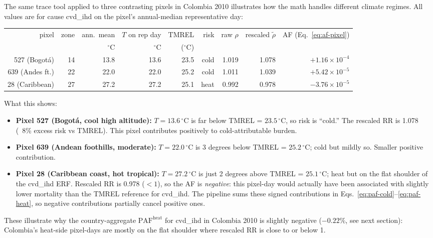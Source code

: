 \documentclass[11pt]{article}
\newcommand{\PAF}{\text{PAF}}
\begin{document}
The same trace tool applied to three contrasting pixels in Colombia 2010
illustrates how the math handles different climate regimes. All values
are for cause cvd\_ihd on the pixel's annual-median representative day:

\begin{center}
\small
\begin{tabular}{r r r r r r r r r}
\toprule
pixel & zone & ann.\ mean & $T$ on rep day & TMREL & risk & raw $\rho$ & rescaled $\tilde\rho$ & AF (Eq.\ \ref{eq:af-pixel}) \\
& & $^{\circ}$C & $^{\circ}$C & ($^{\circ}$C) & & & & \\
\midrule
527 (Bogotá) & 14 & 13.8 & 13.6 & 23.5 & cold & 1.019 & 1.078 & $+1.16\!\times\!10^{-4}$ \\
639 (Andes ft.) & 22 & 22.0 & 22.0 & 25.2 & cold & 1.011 & 1.039 & $+5.42\!\times\!10^{-5}$ \\
28 (Caribbean) & 27 & 27.2 & 27.2 & 25.1 & heat & 0.992 & 0.978 & $-3.76\!\times\!10^{-5}$ \\
\bottomrule
\end{tabular}
\end{center}

What this shows:
\begin{itemize}[itemsep=2pt]
  \item \textbf{Pixel 527 (Bogotá, cool high altitude):} $T = 13.6\,^{\circ}$C
    is far below TMREL = $23.5\,^{\circ}$C, so risk is ``cold.'' The
    rescaled RR is 1.078 (~8\% excess risk vs TMREL). This pixel
    contributes positively to cold-attributable burden.
  \item \textbf{Pixel 639 (Andean foothills, moderate):} $T = 22.0\,^{\circ}$C
    is 3 degrees below TMREL = $25.2\,^{\circ}$C; cold but mildly so.
    Smaller positive contribution.
  \item \textbf{Pixel 28 (Caribbean coast, hot tropical):} $T = 27.2\,^{\circ}$C
    is just 2 degrees above TMREL = $25.1\,^{\circ}$C; heat but on the
    flat shoulder of the cvd\_ihd ERF. Rescaled RR is 0.978 ($<1$), so
    the AF is \emph{negative}: this pixel-day would actually have
    been associated with slightly lower mortality than the TMREL
    reference for cvd\_ihd. The pipeline sums these signed contributions
    in Eqs.~\eqref{eq:paf-cold}--\eqref{eq:paf-heat}, so negative
    contributions partially cancel positive ones.
\end{itemize}

These illustrate why the country-aggregate $\PAF^{\text{heat}}$ for
cvd\_ihd in Colombia 2010 is slightly negative ($-0.22\%$, see next
section): Colombia's heat-side pixel-days are mostly on the flat
shoulder where rescaled RR is close to or below 1.
\end{document}
